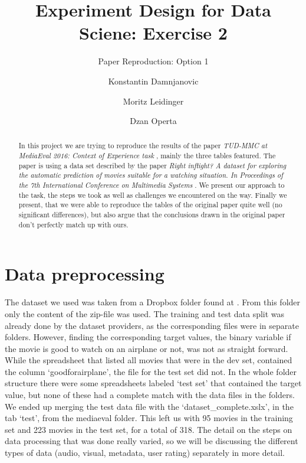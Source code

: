 \documentclass[sigconf]{acmart}
\begin{document}
\title{Experiment Design for Data Sciene: Exercise 2}
\subtitle{Paper Reproduction: Option 1}

\author{Konstantin Damnjanovic}

\author{Moritz Leidinger}

\author{Dzan Operta}

\begin{abstract}
  In this project we are trying to reproduce the results of the paper \textit{TUD-MMC at MediaEval 2016: Context of Experience task} \cite{MediaEval}, mainly the three tables featured. The paper is using a data set described by the paper \textit{Right inflight? A dataset for exploring the automatic prediction of movies suitable for a watching situation. In Proceedings of the 7th International Conference on Multimedia Systems} \cite{Dataset}. We present our approach to the task, the steps we took as well as challenges we encountered on the way. Finally we present, that we were able to reproduce the tables of the original paper quite well (no significant differences), but also argue that the conclusions drawn in the original paper don't perfectly match up with ours.
\end{abstract}

\maketitle

\section{Data preprocessing}

The dataset we used was taken from a Dropbox folder found at \cite{Dropbox}. From this folder only the content of the zip-file was used. The training and test data split was already done by the dataset providers, as the corresponding files were in separate folders. However, finding the corresponding target values, the binary variable if the movie is good to watch on an airplane or not, was not as straight forward. While the spreadsheet that listed all movies that were in the dev set, contained the column \lq goodforairplane\rq, the file for the test set did not. In the whole folder structure there were some spreadsheets labeled ‘test set’ that contained the target value, but none of these had a complete match with the data files in the folders. We ended up merging the test data file with the \lq dataset\_complete.xslx\rq , in the tab \lq test\rq, from the mediaeval folder. This left us with 95 movies in the training set and 223 movies in the test set, for a total of 318. The detail on the steps on data processing that was done really varied, so we will be discussing the different types of data (audio, visual, metadata, user rating) separately in more detail.
\end{document}
